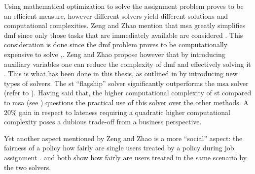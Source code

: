 \documentclass{seal_thesis}
\begin{document}
Using mathematical optimization to solve the assignment problem proves to be an efficient measure, however different solvers yield different solutions and computational complexities. Zeng and Zhao mention that \gls{msa} greatly simplifies \gls{dmf} since only those tasks that are immediately available are considered \cite[p. 15]{Zeng2005}. This consideration is done since the \gls{dmf} problem proves to be computationally expensive to solve \cite[p. 13]{Zeng2005},\cite{Garey1990}. Zeng and Zhao propose however that by introducing auxiliary variables one can reduce the complexity of \gls{dmf} and effectively solving it \cite[p. 13]{Zeng2005}. This is what has been done in this thesis, as outlined in  by introducing new types of solvers. The \gls{st} ``flagship'' solver significantly outperforms the \gls{msa} solver (refer to ). Having said that, the higher computational complexity of \gls{st} compared to \gls{msa} (see ) questions the practical use of this solver over the other methods. A $20\%$ gain in respect to lateness requiring a quadratic higher computational complexity poses a dubious trade-off from a business perspective.


Yet another aspect mentioned by Zeng and Zhao is a more ``social'' aspect: the fairness of a policy \ie how fairly are single users treated by a policy during job assignment \cite[pp. 17-18]{Zeng2005}.  and  both show how fairly are users treated in the same scenario by the two solvers.
\end{document}
